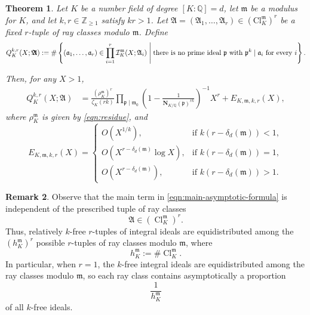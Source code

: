 \documentclass[11pt, reqno]{amsart}
\numberwithin{equation}{section}
\newtheorem{theorem}{Theorem}[section]
\newcommand{\suchthat}{\;\ifnum\currentgrouptype=16 \middle\fi|\;}
\newcommand{\Z}{\mathbb{Z}}
\newcommand{\Q}{\mathbb{Q}}
\newcommand{\Cl}{\operatorname{Cl}}
\newcommand{\Nrm}[2]{\mathbf{N}_{#1}(#2)}
\theoremstyle{definition}
\newtheorem{remark}[theorem]{Remark}
\begin{document}
\begin{theorem}\label{thm:main-theorem}
Let $K$ be a number field of degree $[K:\Q]=d$, let $\mathfrak{m}$
be a modulus for $K$, and let $k,r\in\Z_{\geq1}$ satisfy $kr>1$.
Let $\boldsymbol{\mathfrak{A}} = (\mathfrak{A}_1,\ldots,\mathfrak{A}_r) \in \left(\mathrm{Cl}_K^{\mathfrak{m}}\right)^r$ be a fixed $r$-tuple of ray classes modulo $\mathfrak{m}$. Define
\begin{equation*}
Q_K^{k,r}(X;\boldsymbol{\mathfrak{A}})
:=
\#\left\{
(\mathfrak{a}_1,\ldots,\mathfrak{a}_r)
\in
\prod_{i=1}^{r}
\mathcal{I}_K^{\mathfrak{m}}(X;\mathfrak{A}_i)
\suchthat
\text{there is no prime ideal $\mathfrak{p}$ with }
\mathfrak{p}^k\mid\mathfrak{a}_i
\text{ for every $i$}
\right\}.
\end{equation*}

Then, for any $X>1$,
\begin{align}\label{eqn:main-asymptotic-formula}
Q_K^{k,r}(X;\boldsymbol{\mathfrak{A}})
&=
\frac{\left(\rho_K^{\mathfrak{m}}\right)^r}
{\zeta_K(rk)}
\prod_{\mathfrak{p}\mid\mathfrak{m}_0}
\left(
1-\frac{1}{\Nrm{K/\Q}{\mathfrak{p}}^{rk}}
\right)^{-1}
X^r
+
E_{K,\mathfrak{m},k,r}(X),
\end{align}
where $\rho_K^{\mathfrak{m}}$ is given by
\eqref{eqn:residue}, and
\begin{equation}\label{eqn:main-error-term}
E_{K,\mathfrak{m},k,r}(X)
=
\begin{cases}
\displaystyle
O\left(X^{1/k}\right),
&
\text{if } k\left(r-\delta_d(\mathfrak{m})\right)<1,
\\[8pt]
\displaystyle
O\left(
X^{r-\delta_d(\mathfrak{m})}\log X
\right),
&
\text{if } k\left(r-\delta_d(\mathfrak{m})\right)=1,
\\[8pt]
\displaystyle
O\left(
X^{r-\delta_d(\mathfrak{m})}
\right),
&
\text{if } k\left(r-\delta_d(\mathfrak{m})\right)>1.
\end{cases}
\end{equation}
\end{theorem}


\begin{remark}
Observe that the main term in
\eqref{eqn:main-asymptotic-formula} is independent of the prescribed
tuple of ray classes
\[
\boldsymbol{\mathfrak{A}}
\in
\left(\Cl_K^{\mathfrak{m}}\right)^r.
\]
Thus, relatively $k$-free $r$-tuples of integral ideals are
equidistributed among the
$\left(h_K^{\mathfrak{m}}\right)^r$ possible $r$-tuples of ray
classes modulo $\mathfrak{m}$, where
\[
h_K^{\mathfrak{m}}
:=
\#\Cl_K^{\mathfrak{m}}.
\]
In particular, when $r=1$, the $k$-free integral ideals are
equidistributed among the ray classes modulo $\mathfrak{m}$, so each
ray class contains asymptotically a proportion
\[
\frac{1}{h_K^{\mathfrak{m}}}
\]
of all $k$-free ideals.
\end{remark}
\end{document}
